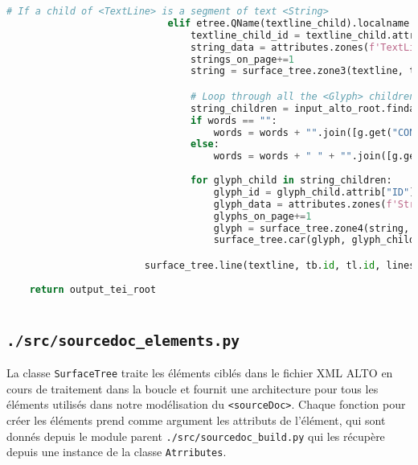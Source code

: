 \documentclass[class=article, crop=false]{standalone}
\begin{document}
\begin{lstlisting}[language=python, style=python]
                            # If a child of <TextLine> is a segment of text <String>
                            elif etree.QName(textline_child).localname == "String":
                                textline_child_id = textline_child.attrib["ID"]
                                string_data = attributes.zones(f'TextLine[@ID="{tl.id}"]', f'String[@ID="{textline_child_id}"]', None)[0]
                                strings_on_page+=1
                                string = surface_tree.zone3(textline, tb.id, tl.id, string_data.attributes, string_data.id, strings_on_page)

                                # Loop through all the <Glyph> children of a <String>
                                string_children = input_alto_root.findall(f'.//a:String[@ID="{textline_child_id}"]/a:Glyph', namespaces=NS)
                                if words == "":
                                    words = words + "".join([g.get("CONTENT") for g in string_children])
                                else:
                                    words = words + " " + "".join([g.get("CONTENT") for g in string_children])
                                    
                                for glyph_child in string_children:
                                    glyph_id = glyph_child.attrib["ID"]
                                    glyph_data = attributes.zones(f'String[@ID="{textline_child_id}"]', f'Glyph[@ID="{glyph_id}"]', None)[0]
                                    glyphs_on_page+=1
                                    glyph = surface_tree.zone4(string, tb.id, tl.id, textline_child_id, glyph_data.attributes, glyph_id, glyphs_on_page)
                                    surface_tree.car(glyph, glyph_child, tb.id, tl.id, textline_child_id, glyph_id, glyphs_on_page)

                        surface_tree.line(textline, tb.id, tl.id, lines_on_page, words)
  
    return output_tei_root
    
\end{lstlisting}

\subsection{\texttt{./src/sourcedoc\_elements.py}}
La classe \texttt{SurfaceTree} traite les éléments ciblés dans le fichier \acrshort{XML} \acrshort{ALTO} en cours de traitement dans la boucle et fournit une architecture pour tous les éléments utilisés dans notre modélisation du \texttt{<sourceDoc>}. Chaque fonction pour créer les éléments prend comme argument les attributs de l'élément, qui sont donnés depuis le module parent \texttt{./src/sourcedoc\_build.py} qui les récupère depuis une instance de la classe \texttt{Atrributes}.
\end{document}
